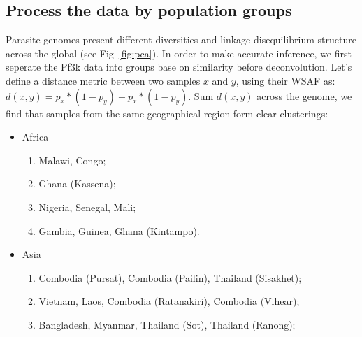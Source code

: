 \documentclass{article}
\begin{document}
\subsection{Process the data by population groups}

Parasite genomes present different diversities and linkage disequilibrium structure across the global (see Fig~\ref{fig:pca}). In order to make accurate inference, we first seperate the Pf3k data into groups base on similarity before deconvolution. Let's define a distance metric between two samples $x$ and $y$, using their WSAF as:
$d(x, y) = p_{x} * (1-p_{y}) + p_{x} * (1-p_{y})$. Sum $d(x, y)$ across the genome, we find that samples from the same geographical region form clear clusterings:
\linespread{1}
\begin{itemize}
\item Africa
\begin{enumerate}
\item Malawi, Congo;
\item Ghana (Kassena);
\item Nigeria, Senegal, Mali;
\item Gambia, Guinea, Ghana (Kintampo).
\end{enumerate}
\item Asia
\begin{enumerate}
\item Combodia (Pursat), Combodia (Pailin), Thailand (Sisakhet);
\item Vietnam, Laos, Combodia (Ratanakiri), Combodia (Vihear);
\item Bangladesh, Myanmar, Thailand (Sot), Thailand (Ranong);
\end{enumerate}
\end{itemize}
\linespread{1.5}
\end{document}
